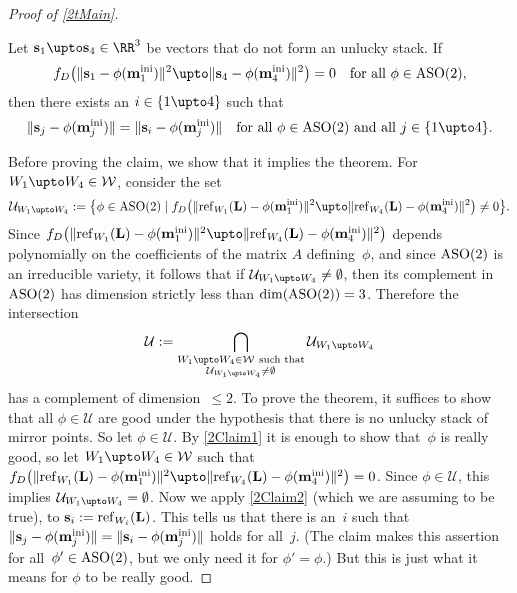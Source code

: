 \documentclass[reqno]{amsart}
\begin{document}
\begin{proof}[Proof of \cref{2tMain}]
  \begin{claim} \label{2Claim2}%
    Let $\ve s_1 \upto \ve s_4 \in \RR^3$ be vectors that do not form an unlucky stack. If
    \begin{equation} \label{eqClaim2h}%
      f_D\bigl(\lVert\ve s_1 - \phi(\ve m_1^\ini)\rVert^2 \upto
      \lVert\ve s_4 - \phi(\ve m_4^\ini)\rVert^2\bigr) = 0 \quad
      \text{for all} \ \phi \in \ASO(2),
    \end{equation}
    then there exists an $i \in \{1 \upto 4\}$ such that
    \begin{equation} \label{eqClaim2a}%
      \lVert\ve s_j - \phi(\ve m_j^\ini)\rVert = \lVert\ve s_i -
      \phi(\ve m_j^\ini)\rVert \quad \text{for all} \ \phi \in \ASO(2)
      \ \text{and all} \ j \in \{1 \upto 4\}.
    \end{equation}
  \end{claim}
  Before proving the claim, we show that it implies the theorem. For
  $W_1 \upto W_4 \in \mathcal W$, consider the set
  \[
    \mathcal U_{W_1 \upto W_4} := \bigl\{\phi \in \ASO(2) \mid
    f_D\bigl(\lVert\re_{W_1}(\ve L) - \phi(\ve m_1^\ini)\rVert^2 \upto
    \lVert\re_{W_4}(\ve L) - \phi(\ve m_4^\ini)\rVert^2\bigr) \ne
    0\bigr\}.
  \]
  Since
  $f_D\bigl(\lVert\re_{W_1}(\ve L) - \phi(\ve m_1^\ini)\rVert^2 \upto
  \lVert\re_{W_4}(\ve L) - \phi(\ve m_4^\ini)\rVert^2\bigr)$ depends
  polynomially on the coefficients of the matrix $A$ defining~$\phi$,
  and since $\operatorname{ASO}(2)$ is an irreducible variety, it follows that if
  $\mathcal U_{W_1 \upto W_4} \ne \emptyset$, then its complement in
  $\operatorname{ASO}(2)$ has dimension strictly less than $\dim(\operatorname{ASO}(2)) =
  3$. Therefore the intersection
  \[
    \mathcal U := \bigcap_{\substack{W_1 \upto W_4 \in \mathcal W\
        \text{such that} \\ \mathcal U_{W_1 \upto W_4} \ne \emptyset}}
    \mathcal U_{W_1 \upto W_4}
  \]
  has a complement of dimension~$\le 2$. To prove the theorem, it
  suffices to show that all $\phi \in \mathcal U$ are good under the
  hypothesis that there is no unlucky stack of mirror points. So let $\phi \in \mathcal U$. By \cref{2Claim1} it is enough
  to show that~$\phi$ is really good, so let
  $W_1 \upto W_4 \in \mathcal W$ such that
  $f_D\bigl(\lVert\re_{W_1}(\ve L) - \phi(\ve m_1^\ini)\rVert^2 \upto
  \lVert\re_{W_4}(\ve L) - \phi(\ve m_4^\ini)\rVert^2\bigr) =
  0$. Since $\phi \in \mathcal U$, this implies
  $\mathcal U_{W_1 \upto W_4} = \emptyset$. Now we apply
  \cref{2Claim2} (which we are assuming to be true), to
  $\mathbf{s}_i := \operatorname{ref}_{W_i}(\mathbf{L})$. This tells us that there is
  an~$i$ such that
  $\lVert\mathbf{s}_j - \phi(\mathbf{m}_j^{\operatorname{ini}})\rVert = \lVert\mathbf{s}_i - \phi(\mathbf{m}_j^{\operatorname{ini}})\rVert$ holds for all~$j$. (The claim makes this assertion
  for all~$\phi' \in \operatorname{ASO}(2)$, but we only need it for
  $\phi' = \phi$.)  But this is just what it means for $\phi$ to be
  really good.


\end{proof}
\end{document}
